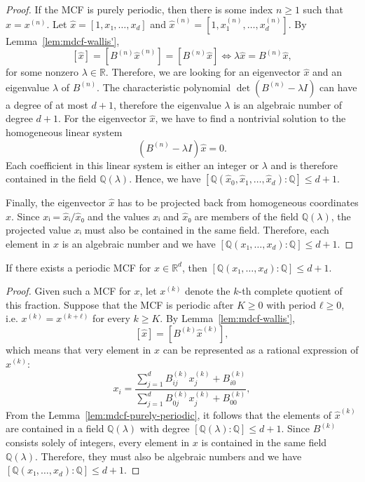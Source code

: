 \begin{proof}
  If the MCF is purely periodic, then there is some index $n ≥ 1$ such that $x = x^{(n)}$.
  Let $\hat x = [1, x₁, …, x_d]$ and $\hat x^{(n)} = [1, x_1^{(n)}, …, x_d^{(n)}]$.
  By Lemma~\ref{lem:mdcf-wallis'},
  \[
    [\hat x] = [B^{(n)} \hat x^{(n)}] = [B^{(n)} \hat x] \iff λ \hat x = B^{(n)} \hat x,
  \]
  for some nonzero $λ ∈ ℝ$.
  Therefore, we are looking for an eigenvector $\hat x$ and an eigenvalue $λ$ of $B^{(n)}$.
  The characteristic polynomial $\det(B^{(n)} - λ I)$ can have a degree of at most $d+1$,
  therefore the eigenvalue $λ$ is an algebraic number of degree $d+1$.
  For the eigenvector $\hat x$, we have to find a nontrivial solution to the
  homogeneous linear system
  \[
    (B^{(n)} - λ I) \hat x = 0.
  \]
  Each coefficient in this linear system is either an integer or $λ$ and is
  therefore contained in the field $ℚ(λ)$.
  Hence, we have $[ℚ(\hat x_0, \hat x_1, …, \hat x_d) : ℚ] ≤ d+1$.

  Finally, the eigenvector $\hat x$ has to be projected back from homogeneous coordinates $x$.
  Since $xᵢ = \hat xᵢ / \hat x₀$ and the values $\hat xᵢ$ and $\hat x₀$ are members of the field $ℚ(λ)$,
  the projected value $xᵢ$ must also be contained in the same field.
  Therefore, each element in $x$ is an algebraic number
  and we have $[ℚ(x₁, …, x_d) : ℚ] ≤ d+1$.
\end{proof}

\begin{theorem}
  \label{thm:mdcf-periodic}
  If there exists a periodic MCF for $x ∈ ℝ^d$,
  then $[ℚ(x₁, …, x_d) : ℚ] ≤ d + 1$.
\end{theorem}

\begin{proof}
  Given such a MCF for $x$, let $x^{(k)}$ denote the $k$-th complete quotient
  of this fraction.
  Suppose that the MCF is periodic after $K ≥ 0$ with period $ℓ ≥ 0$, i.e.
  $x^{(k)} = x^{(k+ℓ)}$ for every $k ≥ K$.
  By Lemma~\ref{lem:mdcf-wallis'},
  \[
    [\hat x] = [B^{(k)} \hat x^{(k)}],
  \]
  which means that very element in $x$ can be represented
  as a rational expression of $x^{(k)}$:
  \[
    x_i = \frac{∑_{j=1}^d B_{ij}^{(k)} x_j^{(k)} + B_{i0}^{(k)}}{\sum_{j=1}^d B_{0j}^{(k)} x_j^{(k)} + B_{00}^{(k)}},
  \]
  From the Lemma~\ref{lem:mdcf-purely-periodic},
  it follows that the elements of $\hat x^{(k)}$
  are contained in a field $ℚ(λ)$ with degree $[ℚ(λ) : ℚ] ≤ d+1$.
  Since $B^{(k)}$ consists solely of integers, every element in $x$ is contained in the same field $ℚ(λ)$.
  Therefore, they must also be algebraic numbers
  and we have $[ℚ(x₁, …, x_d) : ℚ] ≤ d+1$.
\end{proof}

